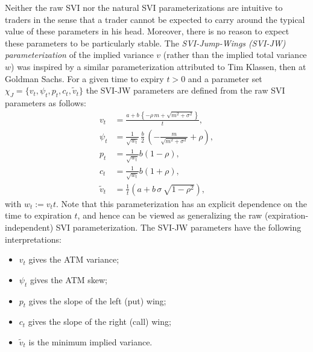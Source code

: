 \documentclass[12pt]{article}
\numberwithin{equation}{section}
\begin{document}
Neither the raw SVI nor the natural SVI parameterizations are intuitive to traders in the sense that a trader cannot be expected to carry around the typical value of these parameters in his head.
Moreover, there is no reason to expect these parameters to be particularly stable.
The {\em SVI-Jump-Wings (SVI-JW) parameterization}  of the implied variance $v$ (rather than the implied total variance $w$) was inspired by a similar parameterization attributed to Tim Klassen, then at Goldman Sachs.
For a given time to expiry $t>0$ and a parameter set $\chi_J=\{v_t,\psi_t,p_t,c_t,\widetilde v_t\}$ the SVI-JW parameters are defined from the raw SVI parameters as follows:
\begin{equation}\label{eq:rawToJW}
\left.
\begin{array}{rll}
v_t & = \displaystyle \frac{a+  b \,\left\{-\rho\,m+\sqrt{m^2+\sigma^2} \right\}}{t},\\
\psi_t & = \displaystyle \frac{1}{ \sqrt{w_t}}\,\frac{ b}{2}\,\left( - \frac{m}{{\sqrt{m^2 + { \sigma}^2}}} + \rho \right),\\
p_t & = \displaystyle \frac{1}{\sqrt{w_t}}b\left(1-\rho\right),\\
c_t & = \displaystyle \frac{1}{ \sqrt{w_t}}b\left(1+\rho\right),\\
\widetilde v_t & = \displaystyle \frac{1}{t}\left(a+ b\,\sigma\,\sqrt{1-\rho^2}\right),
\end{array}
\right.
\end{equation}
with $w_t:= v_tt$.
Note that this parameterization has an explicit dependence on the time to expiration $t$, and hence can be viewed as generalizing the raw (expiration-independent) SVI parameterization.
The SVI-JW parameters have the following interpretations:
\begin{itemize}
\item{$v_t$ gives {the} ATM variance;}
\item{$\psi_t$ gives {the} ATM skew;}
\item{$p_t$ gives the slope of the left (put) wing;}
\item{$c_t$ gives the slope of the right (call) wing;}
\item{$\widetilde v_t$ is the minimum implied variance.}
\end{itemize}
\end{document}
